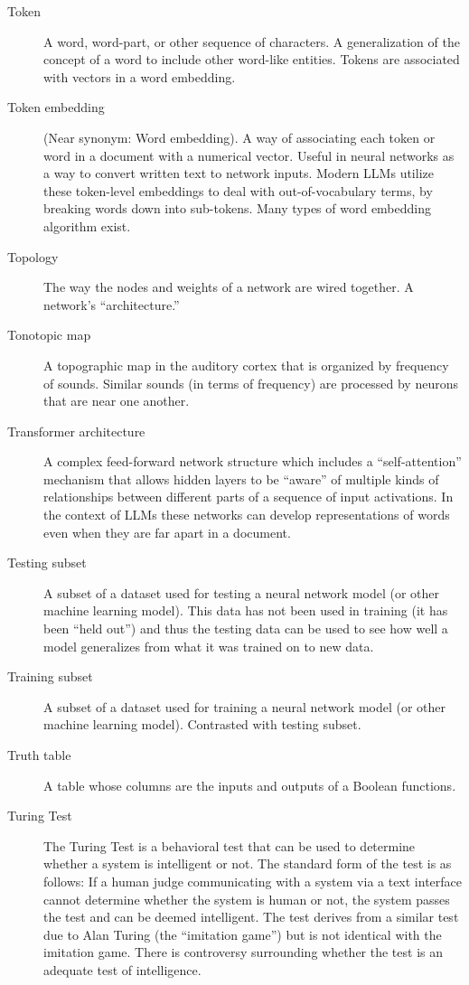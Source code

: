 \begin{description}
\item[Token] A word, word-part, or other sequence of characters. A generalization of the concept of a word to include other word-like entities. Tokens are associated with vectors in a word embedding.

\item[Token embedding] (Near synonym: Word embedding). A way of associating each token or word in a document with a numerical vector. Useful in neural networks as a way to convert written text to network inputs. Modern LLMs utilize these token-level embeddings to deal with out-of-vocabulary terms, by breaking words down into sub-tokens. Many types of word embedding algorithm exist.

\item[Topology] The way the nodes and weights of a network are wired together. A network's ``architecture.''

\item[Tonotopic map] A topographic map in the auditory cortex that is organized by frequency of sounds. Similar sounds (in terms of frequency) are processed by neurons that are near one another.

\item[Transformer architecture] A complex feed-forward network structure which includes a ``self-attention'' mechanism that allows hidden layers to be ``aware'' of multiple kinds of relationships between different parts of a sequence of input activations. In the context of LLMs these networks can develop representations of words even when they are far apart in a document.

\item[Testing subset] A subset of a dataset used for testing a neural network model (or other machine learning model). This data has not been used in training (it has been ``held out'') and thus the testing data can be used to see how well a model generalizes from what it was trained on to new data.

\item[Training subset] A subset of a dataset used for training a neural network model (or other machine learning model). Contrasted with testing subset.

\item[Truth table] A table whose columns are the inputs and outputs of a Boolean functions.

\item[Turing Test] The Turing Test is a behavioral test that can be used to determine whether a system is intelligent or not. The standard form of the test is as follows: If a human judge communicating with a system via a text interface cannot determine whether the system is human or not, the system passes the test and can be deemed intelligent.  The test derives from a similar test due to Alan Turing (the ``imitation game'') but is not identical with the imitation game. There is controversy surrounding whether the test is an adequate test of intelligence.


\end{description}
